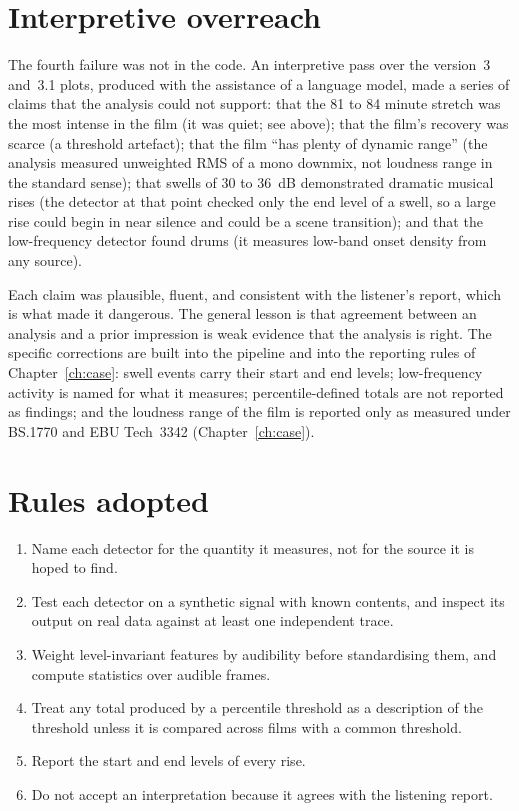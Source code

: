 \section{Interpretive overreach}

The fourth failure was not in the code. An interpretive pass over the version~3 and~3.1 plots, produced with the assistance of a language model, made a series of claims that the analysis could not support: that the 81 to 84 minute stretch was the most intense in the film (it was quiet; see above); that the film's recovery was scarce (a threshold artefact); that the film ``has plenty of dynamic range'' (the analysis measured unweighted RMS of a mono downmix, not loudness range in the standard sense); that swells of 30 to 36~dB demonstrated dramatic musical rises (the detector at that point checked only the end level of a swell, so a large rise could begin in near silence and could be a scene transition); and that the low-frequency detector found drums (it measures low-band onset density from any source).

Each claim was plausible, fluent, and consistent with the listener's report, which is what made it dangerous. The general lesson is that agreement between an analysis and a prior impression is weak evidence that the analysis is right. The specific corrections are built into the pipeline and into the reporting rules of Chapter~\ref{ch:case}: swell events carry their start and end levels; low-frequency activity is named for what it measures; percentile-defined totals are not reported as findings; and the loudness range of the film is reported only as measured under BS.1770 and EBU Tech~3342 (Chapter~\ref{ch:case}).

\section{Rules adopted}

\begin{enumerate}
\item Name each detector for the quantity it measures, not for the source it is hoped to find.
\item Test each detector on a synthetic signal with known contents, and inspect its output on real data against at least one independent trace.
\item Weight level-invariant features by audibility before standardising them, and compute statistics over audible frames.
\item Treat any total produced by a percentile threshold as a description of the threshold unless it is compared across films with a common threshold.
\item Report the start and end levels of every rise.
\item Do not accept an interpretation because it agrees with the listening report.
\end{enumerate}
